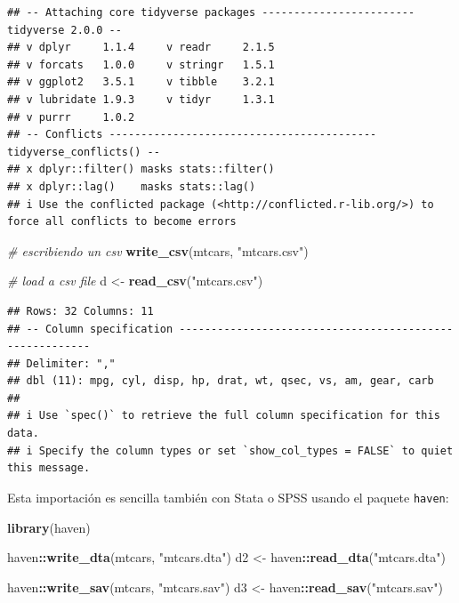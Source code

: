 \documentclass[
]{article}
\newenvironment{Shaded}{\begin{snugshade}}{\end{snugshade}}
\newcommand{\CommentTok}[1]{\textcolor[rgb]{0.56,0.35,0.01}{\textit{#1}}}
\newcommand{\FunctionTok}[1]{\textcolor[rgb]{0.13,0.29,0.53}{\textbf{#1}}}
\newcommand{\NormalTok}[1]{#1}
\newcommand{\OtherTok}[1]{\textcolor[rgb]{0.56,0.35,0.01}{#1}}
\newcommand{\SpecialCharTok}[1]{\textcolor[rgb]{0.81,0.36,0.00}{\textbf{#1}}}
\newcommand{\StringTok}[1]{\textcolor[rgb]{0.31,0.60,0.02}{#1}}
\begin{document}
\begin{verbatim}
## -- Attaching core tidyverse packages ------------------------ tidyverse 2.0.0 --
## v dplyr     1.1.4     v readr     2.1.5
## v forcats   1.0.0     v stringr   1.5.1
## v ggplot2   3.5.1     v tibble    3.2.1
## v lubridate 1.9.3     v tidyr     1.3.1
## v purrr     1.0.2     
## -- Conflicts ------------------------------------------ tidyverse_conflicts() --
## x dplyr::filter() masks stats::filter()
## x dplyr::lag()    masks stats::lag()
## i Use the conflicted package (<http://conflicted.r-lib.org/>) to force all conflicts to become errors
\end{verbatim}

\begin{Shaded}
\begin{Highlighting}[]
\CommentTok{\# escribiendo un csv}
\FunctionTok{write\_csv}\NormalTok{(mtcars, }\StringTok{"mtcars.csv"}\NormalTok{)}

\CommentTok{\# load a csv file}
\NormalTok{d }\OtherTok{\textless{}{-}} \FunctionTok{read\_csv}\NormalTok{(}\StringTok{"mtcars.csv"}\NormalTok{)}
\end{Highlighting}
\end{Shaded}

\begin{verbatim}
## Rows: 32 Columns: 11
## -- Column specification --------------------------------------------------------
## Delimiter: ","
## dbl (11): mpg, cyl, disp, hp, drat, wt, qsec, vs, am, gear, carb
## 
## i Use `spec()` to retrieve the full column specification for this data.
## i Specify the column types or set `show_col_types = FALSE` to quiet this message.
\end{verbatim}

Esta importación es sencilla también con Stata o SPSS usando el paquete
\texttt{haven}:

\begin{Shaded}
\begin{Highlighting}[]
\FunctionTok{library}\NormalTok{(haven)}

\NormalTok{haven}\SpecialCharTok{::}\FunctionTok{write\_dta}\NormalTok{(mtcars, }\StringTok{"mtcars.dta"}\NormalTok{)}
\NormalTok{d2 }\OtherTok{\textless{}{-}}\NormalTok{ haven}\SpecialCharTok{::}\FunctionTok{read\_dta}\NormalTok{(}\StringTok{"mtcars.dta"}\NormalTok{)}

\NormalTok{haven}\SpecialCharTok{::}\FunctionTok{write\_sav}\NormalTok{(mtcars, }\StringTok{"mtcars.sav"}\NormalTok{)}
\NormalTok{d3 }\OtherTok{\textless{}{-}}\NormalTok{ haven}\SpecialCharTok{::}\FunctionTok{read\_sav}\NormalTok{(}\StringTok{"mtcars.sav"}\NormalTok{)}
\end{Highlighting}
\end{Shaded}
\end{document}
